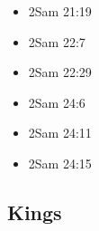 \documentclass[14pt]{article}
\begin{document}
\begin{multicols}{2}
\begin{itemize}
							\item 2Sam 21:19
							
							\item 2Sam 22:7
							
							\item 2Sam 22:29
							
							\item 2Sam 24:6
							
							\item 2Sam 24:11
							
							\item 2Sam 24:15
							
										\end{itemize}\end{multicols}
						
					\subsection{Kings}
				
\end{document}
